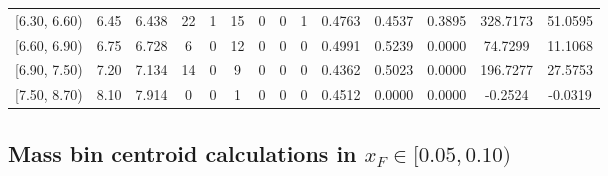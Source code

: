 \begin{table}[htbp]
{\begin{tabular}{cc|c|cccccc|ccc|cc}
        {[6.30, 6.60)} & 6.45 & 6.438 & 22 & 1 & 15 & 0 & 0 & 1 & 0.4763 & 0.4537 & 0.3895 & 328.7173 & 51.0595 \\
        {[6.60, 6.90)} & 6.75 & 6.728 & 6 & 0 & 12 & 0 & 0 & 0 & 0.4991 & 0.5239 & 0.0000 & 74.7299 & 11.1068 \\
        {[6.90, 7.50)} & 7.20 & 7.134 & 14 & 0 & 9 & 0 & 0 & 0 & 0.4362 & 0.5023 & 0.0000 & 196.7277 & 27.5753 \\
        {[7.50, 8.70)} & 8.10 & 7.914 & 0 & 0 & 1 & 0 & 0 & 0 & 0.4512 & 0.0000 & 0.0000 & -0.2524 & -0.0319 \\
        \hline\hline
    \end{tabular}
    }
\end{table}

\clearpage
\subsection{\texorpdfstring{Mass bin centroid calculations in $x_F \in [0.05, 0.10)$}{Mass bin centroid calculations in x\_F in [0.05, 0.10)]}}

